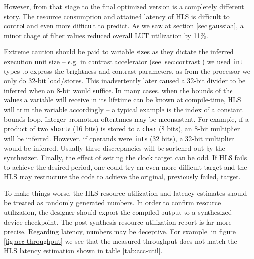However, from that stage to the final optimized version is a completely different story.
The resource consumption and attained latency of HLS is difficult to control and even more difficult to predict.
As we saw at section \ref{sec:gaussian}, a minor chage of filter values reduced overall LUT utilization by 11\%.

Extreme caution should be paid to variable sizes as they dictate the inferred execution unit size -- e.g.
in contrast accelerator (see \ref{sec:contrast}) we used \texttt{int} types to express the brightness and contrast parameters, 
as from the processor we only do 32-bit load/stores.
This inadvertently later caused a 32-bit divider to be inferred when an 8-bit would suffice. In many cases, when the bounds of the values
a variable will receive in its lifetime can be known at compile-time, HLS will trim the variable accordingly -- a typical example
is the index of a constant bounds loop. Integer promotion oftentimes may be inconsistent.
For example, if a product of two \texttt{short}s (16 bits) is stored to a \texttt{char} (8 bits), an 8-bit multiplier will be inferred.
However, if operands were \texttt{int}s (32 bits), a 32-bit multiplier would be inferred. Usually these discrepancies will be sortened out
by the synthesizer. Finally, the effect of setting the clock target can be odd. If HLS fails to achieve the desired period,
one could try an even more difficult target and the HLS may restructure the code to achieve the original, previously failed, target.

To make things worse, the HLS resource utilization and latency estimates should be treated as randomly generated numbers.
In order to confirm resource utilization, the designer should export the compiled output to a synthesized device checkpoint.
The post-synthesis resource utilization report is far more precise. Regarding latency, numbers may be deceptive. For example,
in figure \ref{fig:acc-throughput} we see that the measured throughput does not match the HLS latency estimation shown in table \ref{tab:acc-util}.


